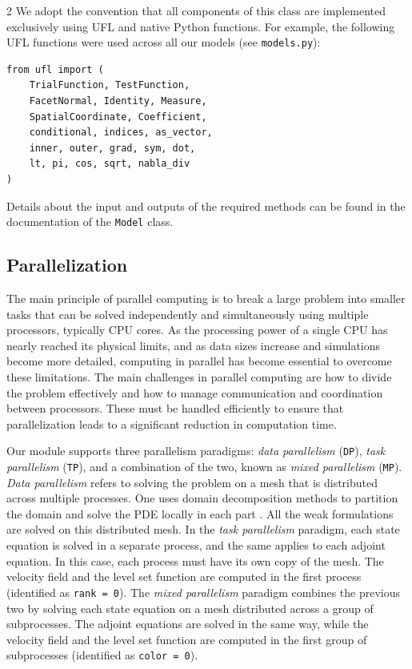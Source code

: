 \documentclass[a4paper, oneside]{article}
\newcommand{\code}[1]{\texttt{#1}}
\begin{document}
\begin{multicols}{2}
We adopt the convention that all components of this class are implemented exclusively using
UFL and native Python functions. For example, the following UFL
functions were used across all our models (see \code{models.py}):
\begin{lstlisting}
from ufl import (
    TrialFunction, TestFunction,
    FacetNormal, Identity, Measure,
    SpatialCoordinate, Coefficient,
    conditional, indices, as_vector,
    inner, outer, grad, sym, dot,
    lt, pi, cos, sqrt, nabla_div
)	
\end{lstlisting}

Details about the input and outputs of the required methods
can be found in the documentation of the \code{Model} class.

\subsection{Parallelization}\label{sub:parallel}

The main principle of parallel computing is to break a large problem into smaller tasks that can be solved independently and simultaneously using multiple processors, typically CPU cores. As the processing power of a single CPU has nearly reached its physical limits, and as data sizes increase and simulations become more detailed, computing in parallel has become essential to overcome these limitations.
The main challenges in parallel computing are how to divide the problem effectively and how to manage communication and coordination between processors. These must be handled efficiently to ensure that parallelization leads to a significant reduction in computation time.

Our module supports three parallelism paradigms:
\textit{data parallelism} (\code{DP}),
\textit{task parallelism} (\code{TP}), and a combination of the two,
known as \textit{mixed parallelism} (\code{MP}).
\textit{Data parallelism} refers to solving the problem on a mesh
that is distributed across multiple processes.
One uses domain decomposition methods to partition the domain and solve the PDE locally in each part \cite{MR2104179}. 
All the weak formulations are solved on this distributed mesh.
In the \textit{task parallelism} paradigm, each state equation is solved
in a separate process, and the same applies to each adjoint equation.
In this case, each process must have its own copy of the mesh.
The velocity field and the level set function are computed
in the first process (identified as \code{rank = 0}).
The \textit{mixed parallelism} paradigm combines the previous two by
solving each state equation on a mesh distributed across a group
of subprocesses. The adjoint equations are solved in the same 
way, while the velocity field and the level set function are computed
in the first group of subprocesses (identified as \code{color = 0}).


\end{multicols}
\end{document}
